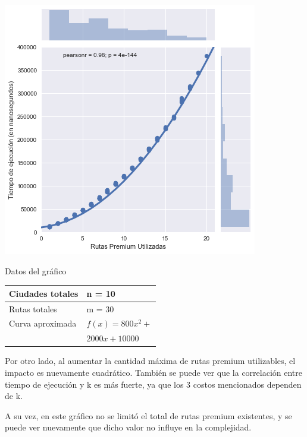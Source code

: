 \noindent
\begin{minipage}{0.55\textwidth}
	\hfill
	\includegraphics[scale=0.65]{imagenes/ej1-4.png}
\end{minipage}
\hfill
\begin{minipage}{0.42\textwidth}
	\begin{center}
		Datos del gráfico

		\begin{tabular}{ | l l |}
			\hline
			Ciudades totales & n = 10 \\ \hline
			Rutas totales & m = 30 \\ \hline
			Curva aproximada & $f(x) = 800 x^2 +$ \\
			 & $2000 x + 10000$ \\
			\hline
		\end{tabular}
	\end{center}
\end{minipage}

Por otro lado, al aumentar la cantidad máxima de rutas premium utilizables, el impacto es nuevamente cuadrático. También se puede ver que la correlación entre tiempo de ejecución y k es más fuerte, ya que los 3 costos mencionados dependen de k.

A su vez, en este gráfico no se limitó el total de rutas premium existentes, y se puede ver nuevamente que dicho valor no influye en la complejidad.
